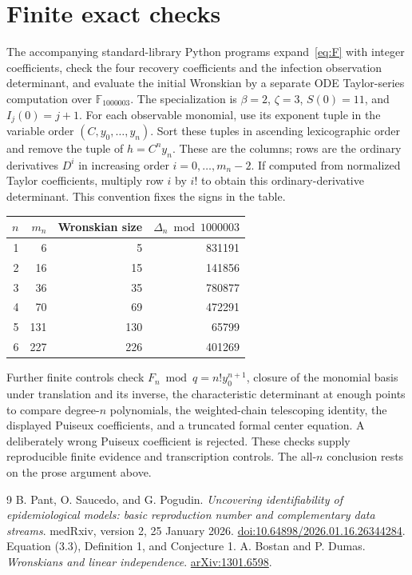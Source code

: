 \documentclass[11pt,a4paper]{article}
\begin{document}
\appendix
\section{Finite exact checks}\label{app:checks}
The accompanying standard-library Python programs expand~\eqref{eq:F} with integer coefficients, check the four recovery coefficients and the infection observation determinant, and evaluate the initial Wronskian by a separate ODE Taylor-series computation over $\mathbb F_{1000003}$. The specialization is $\beta=2$, $\zeta=3$, $S(0)=11$, and $I_j(0)=j+1$. For each observable monomial, use its exponent tuple in the variable order $(C,y_0,\ldots,y_n)$. Sort these tuples in ascending lexicographic order and remove the tuple of $h=C^ny_n$. These are the columns; rows are the ordinary derivatives $D^i$ in increasing order $i=0,\ldots,m_n-2$. If computed from normalized Taylor coefficients, multiply row $i$ by $i!$ to obtain this ordinary-derivative determinant. This convention fixes the signs in the table.
\begin{center}
\begin{tabular}{rrrr}
\toprule
$n$ & $m_n$ & Wronskian size & $\Delta_n\bmod1000003$\\
\midrule
1&6&5&831191\\
2&16&15&141856\\
3&36&35&780877\\
4&70&69&472291\\
5&131&130&65799\\
6&227&226&401269\\
\bottomrule
\end{tabular}
\end{center}
Further finite controls check $F_n\bmod q=n!y_0^{n+1}$, closure of the monomial basis under translation and its inverse, the characteristic determinant at enough points to compare degree-$n$ polynomials, the weighted-chain telescoping identity, the displayed Puiseux coefficients, and a truncated formal center equation. A deliberately wrong Puiseux coefficient is rejected. These checks supply reproducible finite evidence and transcription controls. The all-$n$ conclusion rests on the prose argument above.

\begin{thebibliography}{9}
 B. Pant, O. Saucedo, and G. Pogudin.
\emph{Uncovering identifiability of epidemiological models: basic reproduction number and complementary data streams}.
medRxiv, version 2, 25 January 2026.
\href{https://doi.org/10.64898/2026.01.16.26344284}{doi:10.64898/2026.01.16.26344284}.
Equation (3.3), Definition 1, and Conjecture 1.
 A. Bostan and P. Dumas.
\emph{Wronskians and linear independence}.
\href{https://arxiv.org/abs/1301.6598}{arXiv:1301.6598}.
\end{thebibliography}
\end{document}

